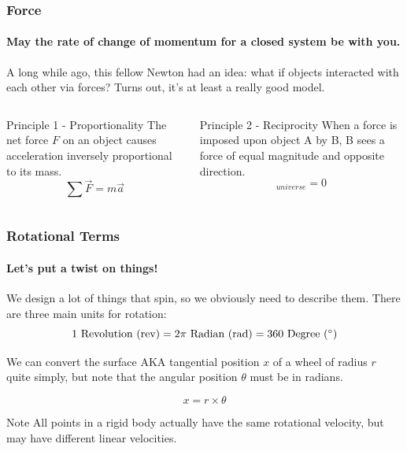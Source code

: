 \documentclass{beamer}%
\begin{document}
\begin{frame}
\frametitle{Force}
\framesubtitle{May the rate of change of momentum for a closed system be with you.}

A long while ago, this fellow Newton had an idea: what if objects interacted with each other via forces?
Turns out, it's at least a really good model.

\begin{columns}
\begin{block}{Principle 1 - Proportionality}
	The net force $F$ on an object causes acceleration inversely proportional to its mass.
	\begin{equation}
		\sum \vec{F} = m \vec{a}
	\end{equation}
\end{block}

\begin{block}{Principle 2 - Reciprocity}
	When a force is imposed upon object A by B, B sees a force of equal magnitude and opposite direction.
	\begin{equation}
		[\sum \vec{F}]_{universe} = 0
	\end{equation}
\end{block}

\end{columns}

\end{frame}

\begin{frame}
\frametitle{Rotational Terms}
\framesubtitle{Let's put a twist on things!}

We design a lot of things that spin, so we obviously need to describe them. There are three main units for rotation:
\begin{equation}
	1 \mbox{ Revolution (rev)} = 2 \pi \mbox{ Radian (rad)} = 360 \mbox{ Degree (\degree)} \nonumber
\end{equation}


We can convert the surface AKA tangential position $x$ of a wheel of radius $r$ quite simply, but note that the angular position $\theta$ must be in radians.

\begin{equation} 
	x = r \times \theta
\end{equation}

\begin{block}{Note}
	All points in a rigid body actually have the same rotational velocity, but may have different linear velocities.
\end{block}
\end{frame}
\end{document}
